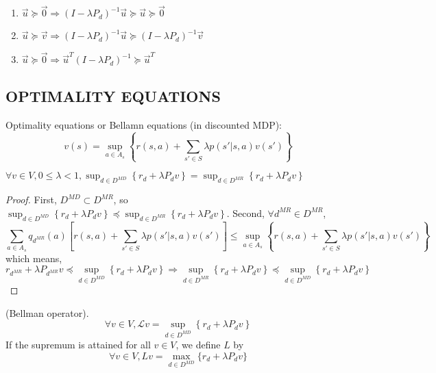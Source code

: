 \begin{lemma}
    \begin{enumerate}
        \item $ \vec u \succeq \vec 0 \Rightarrow {(I - \lambda P_d)}^{-1} \vec u \succeq \vec u \succeq \vec 0 $
        \item $ \vec u \succeq \vec v \Rightarrow {(I - \lambda P_d)}^{-1} \vec u \succeq {(I - \lambda P_d)}^{-1} \vec v $
        \item $ \vec u \succeq \vec 0 \Rightarrow \vec u^T {(I - \lambda P_d)}^{-1} \succeq \vec u^T $
    \end{enumerate}
\end{lemma}

\subsection{OPTIMALITY EQUATIONS}%
\label{sub:optimality_equations}

Optimality equations or Bellamn equations (in discounted MDP):
\[
    v(s) = \sup_{a \in A_s} \left\{ r(s, a) + \sum^{}_{s' \in S} \lambda p(s' | s, a) v(s') \right\}
\]

\begin{lemma}
    $ \forall v \in V, 0 \le \lambda < 1, \sup_{d \in D^{MD}} \left\{ r_d + \lambda P_d v \right\} = \sup_{d \in D^{MR}} \left\{ r_d + \lambda P_d v \right\}$ 
    \begin{proof}
        First, $ D^{MD} \subset D^{MR} $, so $ \sup_{d \in D^{MD}} \left\{ r_d + \lambda P_d v \right\}\preceq \sup_{d \in D^{MR}} \left\{ r_d + \lambda P_d v \right\} $.
    Second, $ \forall d^{MR} \in D^{MR} $,
    \[
        \sum^{}_{a \in A_s} q_{d^{MR}}(a) \left[ r(s, a) + \sum^{}_{s' \in S} \lambda p(s' | s, a) v(s') \right]
        \le \sup_{a \in A_s} \left\{ r(s, a) + \sum^{}_{s' \in S} \lambda p(s'|s, a) v(s') \right\}
    \]
    which means,
    \[
        r_{d^{MR}} +  \lambda P_{d^{MR}} v \preceq \sup_{d \in D^{MD}} \left\{ r_d + \lambda P_d v \right\}
        \Rightarrow \sup_{d \in D^{MR}}\left\{ r_d + \lambda P_d v \right\}
        \preceq \sup_{d \in D^{MD}}\left\{ r_d + \lambda P_d v \right\}
    \]
    
    \end{proof}
\end{lemma}

\begin{definition}
    (Bellman operator).
    \begin{equation}
        \forall v \in V, \mathcal{L} v = \sup_{d \in D^{MD}} \left\{ r_d + \lambda P_d v \right\}
    \end{equation}
    If the supremum is attained for all $ v \in V $, we define $ L $ by
    \begin{equation}
        \forall v \in V, Lv = \max_{d \in D^{MD}}\{r_d + \lambda P_d v\}
    \end{equation}
\end{definition}

